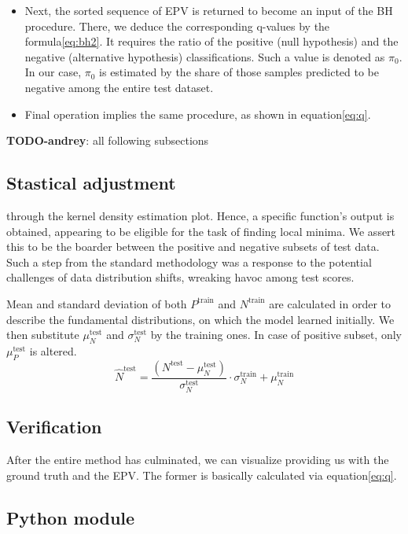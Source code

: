 \documentclass{article}
\newcommand{\todo}[2]{{\color{red} {\bf TODO-#1}: #2}}
\begin{document}
\begin{enumerate}
\begin{itemize}
    \item Next, the sorted sequence of EPV is returned to become an input of the BH procedure. There, we deduce the corresponding q-values by the formula\ref{eq:bh2}. It requires the ratio of the positive (null hypothesis) and the negative (alternative hypothesis) classifications. Such a value is denoted as $\pi_0$. In our case, $\pi_0$ is estimated by the share of those samples predicted to be negative among the entire test dataset. 
    \item Final operation implies the same procedure, as shown in equation\ref{eq:q}.
    \end{itemize}
\end{enumerate}

\todo{andrey}{all following subsections}

\subsection{Stastical adjustment}

through the kernel density estimation plot. Hence, a specific function's output is obtained, appearing to be eligible for the task of finding local minima. We assert this to be the boarder between the positive and negative subsets of test data. Such a step from the standard methodology was a response to the potential challenges of data distribution shifts, wreaking havoc among test scores.

Mean and standard deviation of both $P^{\text{train}}$ and $N^{\text{train}}$ are calculated in order to describe the fundamental distributions, on which the model learned initially. We then substitute $\mu^{\text{test}}_N$ and $\sigma^{\text{test}}_N$ by the training ones. In case of positive subset, only $\mu^{\text{test}}_P$ is altered.
    \begin{equation}
            \hat{N}^{\text{test}} = \frac{(N^{\text{test}} - \mu^{\text{test}}_N)}{\sigma^{\text{test}}_N} \cdot \sigma^{\text{train}}_N + \mu^{\text{train}}_N
    \end{equation}

\subsection{Verification}
After the entire method has culminated, we can visualize 
 providing us with the ground truth and the EPV. The former is basically calculated via equation\ref{eq:q}.

 \subsection{Python module}
\end{document}

